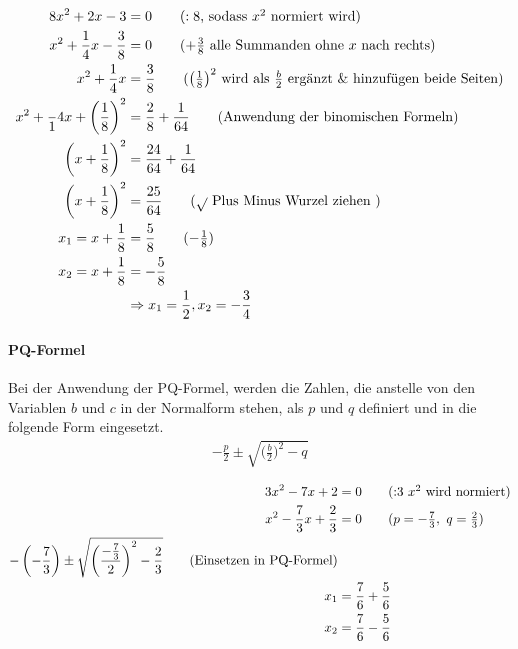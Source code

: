 \begin{beispiel}
	\begin{align*}
		8x^2+2x-3&=0\tag{$:8$, sodass $x^2$ normiert wird}\\
		x^2+\frac{1}{4}x-\frac{3}{8}&=0\tag{$+\frac{3}{8}$ alle Summanden ohne $x$ nach rechts}\\
		x^2+\frac{1}{4}x&=\frac{3}{8}\tag{$\left(\frac{1}{8}\right)^2$ wird als $\frac{b}{2}$ ergänzt \& hinzufügen beide Seiten}\\
		x^2+\frac{}1{4}x+\left(\frac{1}{8}\right)^2&=\frac{2}{8}+\frac{1}{64}\tag{Anwendung der binomischen Formeln}\\
		\left(x+\frac{1}{8}\right)^2&=\frac{24}{64}+\frac{1}{64}\\
		\left(x+\frac{1}{8}\right)^2&=\frac{25}{64}\tag{$\sqrt{ }$ Plus Minus Wurzel ziehen }\\
		x_1= x+\frac{1}{8}&=\frac{5}{8}\tag{$-\frac{1}{8}$}\\
		x_2= x+\frac{1}{8}&=-\frac{5}{8}\\
		&\Rightarrow x_1=\frac{1}{2}, x_2=-\frac{3}{4}
	\end{align*}
\end{beispiel}
\paragraph{PQ-Formel} Bei der Anwendung der PQ-Formel, werden die Zahlen, die anstelle von den Variablen $b$ und $c$ in der Normalform stehen, als $p$ und $q$ definiert und in die folgende Form eingesetzt. 
\begin{align*}
	-\frac{p}{2} \pm\sqrt{\bigg(\frac{b}{2}\bigg)^2-q}
\end{align*}

\begin{beispiel}
	\begin{align*}
		3x^2-7x+2&=0\tag{:3 $x^2$ wird normiert}\\
		x^2-\frac{7}{3}x+\frac{2}{3}&=0\tag{$p=-\frac{7}{3},\ q=\frac{2}{3}$}\\
		-\left(-\frac{7}{3}\right) \pm\sqrt{\left(\frac{-\frac{7}{3}}{2}\right)^2-\frac{2}{3}}\tag{Einsetzen in PQ-Formel}\\
		x_1&= \frac{7}{6}+\frac{5}{6}\\
		x_2&= \frac{7}{6}-\frac{5}{6}\\
	\end{align*}
\end{beispiel}